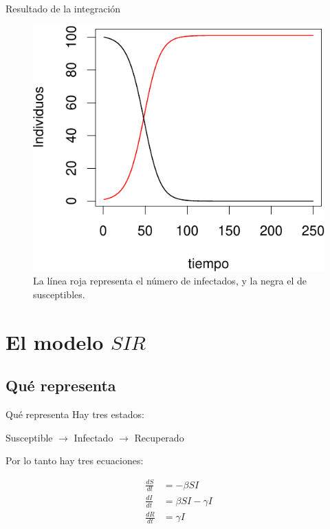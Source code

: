 \documentclass[
  11pt,
  ignorenonframetext,
]{beamer}
\begin{document}
\begin{frame}{Resultado de la integración}
\begin{figure}

{\centering \includegraphics{Modelos-SI-SIR_files/figure-beamer/unnamed-chunk-2-1} 

}

\caption{La línea roja representa el número de infectados, y la negra el de susceptibles.}\label{fig:unnamed-chunk-2}
\end{figure}
\end{frame}

\hypertarget{el-modelo-sir}{%
\section{\texorpdfstring{El modelo
\(SIR\)}{El modelo SIR}}\label{el-modelo-sir}}

\hypertarget{quuxe9-representa}{%
\subsection{Qué representa}\label{quuxe9-representa}}

\begin{frame}{Qué representa}
Hay tres estados:

Susceptible \(\rightarrow\) Infectado \(\rightarrow\) Recuperado

Por lo tanto hay tres ecuaciones:

\begin{align}
\frac{dS}{dt} &= -\beta SI \\
\frac{dI}{dt} &= \beta SI - \gamma I \\
\frac{dR}{dt} &= \gamma I
\end{align}
\end{frame}
\end{document}
